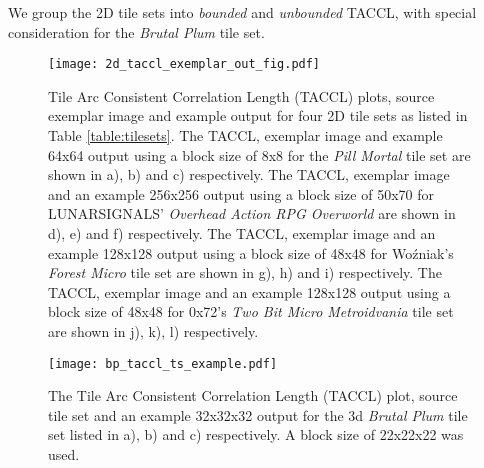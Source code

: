 We group the 2D tile sets into \textit{bounded} and \textit{unbounded} TACCL, with special consideration for
the \textit{Brutal Plum} tile set.


\begin{figure*}[ht]
  \texttt{[image: 2d\_taccl\_exemplar\_out\_fig.pdf]}
  \caption{Tile Arc Consistent Correlation Length (TACCL) plots, source exemplar image and example output for four 2D tile sets as listed in Table \ref{table:tilesets}.
           The TACCL, exemplar image and example 64x64 output using a block size of 8x8 for the \textit{Pill Mortal} tile set are shown in a), b) and c) respectively. The TACCL, exemplar image and an example 256x256 output using a block size of 50x70 for LUNARSIGNALS' \textit{Overhead Action RPG Overworld} are shown in d), e) and f) respectively. The TACCL, exemplar image and an example 128x128 output using a block size of 48x48 for Wo\'zniak's \textit{Forest Micro} tile set are shown in g), h) and i) respectively. The TACCL, exemplar image and an example 128x128 output using a block size of 48x48 for 0x72's \textit{Two Bit Micro Metroidvania} tile set are shown in j), k), l) respectively. }
  \label{fig:2dexamples}
\end{figure*}


\begin{figure}[h]
  \centering
  \texttt{[image: bp\_taccl\_ts\_example.pdf]}
  \caption{The Tile Arc Consistent Correlation Length (TACCL) plot, source tile set and an example 32x32x32 output for the 3d \textit{Brutal Plum} tile set listed in a), b) and c) respectively. A block size of 22x22x22 was used.}
  \label{fig:brutal_plum}
\end{figure}





